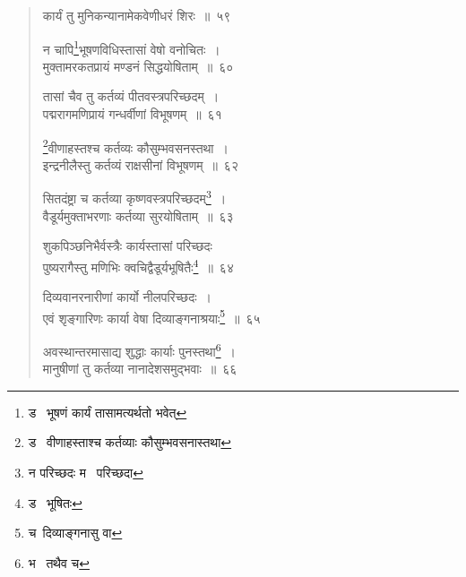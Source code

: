 \documentclass[11pt, openany]{book}
\begin{document}
\begin{quote}
{\na कार्यं तु मुनिकन्यानामेकवेणीधरं शिरः~॥~५९

न चापि\renewcommand{\thefootnote}{1}\footnote{ड \textendash\ भूषणं कार्यं तासामत्यर्थतो भवेत्}भूषणविधिस्तासां वेषो वनोचितः~।\\
मुक्तामरकतप्रायं मण्डनं सिद्धयोषिताम्~॥~६०

तासां चैव तु कर्तव्यं पीतवस्त्रपरिच्छदम्~।\\
पद्मरागमणिप्रायं गन्धर्वीणां विभूषणम्~॥~६१

\renewcommand{\thefootnote}{2}\footnote{ड \textendash\ वीणाहस्ताश्च कर्तव्याः कौसुम्भवसनास्तथा}वीणाहस्तश्च कर्तव्यः कौसुम्भवसनस्तथा~।\\
इन्द्रनीलैस्तु कर्तव्यं राक्षसीनां विभूषणम्~॥~६२

सितदंष्ट्रा च कर्तव्या कृष्णवस्त्रपरिच्छदम्\renewcommand{\thefootnote}{3}\footnote{न परिच्छदः म \textendash\ परिच्छदा}~।\\
वैडूर्यमुक्ताभरणाः कर्तव्या सुरयोषिताम्~॥~६३

शुकपिञ्छनिभैर्वस्त्रैः कार्यस्तासां परिच्छदः\\
पुष्यरागैस्तु मणिभिः क्वचिद्वैडूर्यभूषितैः\renewcommand{\thefootnote}{4}\footnote{ड \textendash\ भूषितः}~॥~६४

दिव्यवानरनारीणां कार्यो नीलपरिच्छदः~।\\
एवं शृङ्गारिणः कार्या वेषा दिव्याङ्गनाश्रयाः\renewcommand{\thefootnote}{5}\footnote{च\textendash\ दिव्याङ्गनासु वा}~॥~६५

अवस्थान्तरमासाद्य शुद्धाः कार्याः पुनस्तथा\renewcommand{\thefootnote}{6}\footnote{भ \textendash\ तथैव च}~।\\
मानुषीणां तु कर्तव्या नानादेशसमुद्भवाः~॥~६६}
\end{quote}

\newpage
\end{document}
